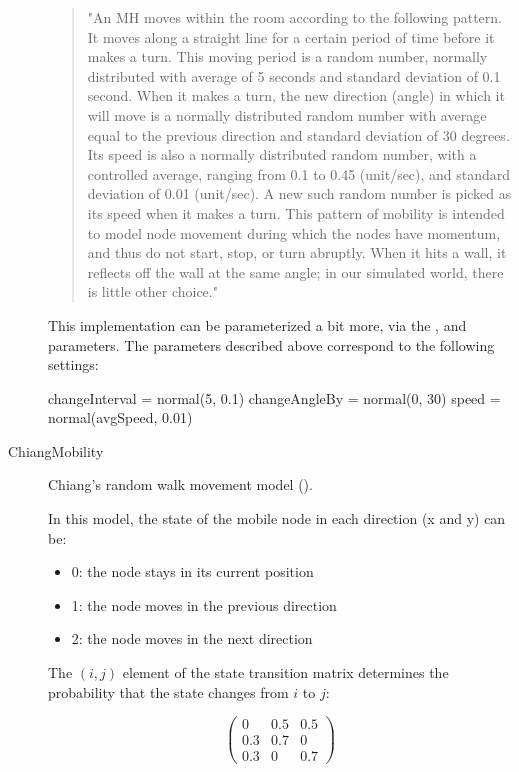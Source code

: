 \begin{description}
\begin{quote}
"An MH moves within the room according to the following pattern. It moves
along a straight line for a certain period of time before it makes a turn.
This moving period is a random number, normally distributed with average of
5 seconds and standard deviation of 0.1 second. When it makes a turn, the
new direction (angle) in which it will move is a normally distributed
random number with average equal to the previous direction and standard
deviation of 30 degrees. Its speed is also a normally distributed random
number, with a controlled average, ranging from 0.1 to 0.45 (unit/sec), and
standard deviation of 0.01 (unit/sec). A new such random number is picked
as its speed when it makes a turn. This pattern of mobility is intended to
model node movement during which the nodes have momentum, and thus do not
start, stop, or turn abruptly. When it hits a wall, it reflects off the
wall at the same angle; in our simulated world, there is little other
choice."
\end{quote}

This implementation can be parameterized a bit more, via the
,  and  parameters.
The parameters described above correspond to the following settings:

\begin{inifile}
changeInterval = normal(5, 0.1)
changeAngleBy = normal(0, 30)
speed = normal(avgSpeed, 0.01)
\end{inifile}

\item[ChiangMobility] Chiang's random walk movement model
(\cite{Chiang98wirelessnetwork}).

In this model, the state of the mobile node in each direction (x and y) can be:

\begin{itemize}
  \item 0: the node stays in its current position
  \item 1: the node moves in the previous direction
  \item 2: the node moves in the next direction
\end{itemize}

The $(i,j)$ element of the state transition matrix determines the
probability that the state changes from $i$ to $j$:

$$ \left(
\begin{array}{ccc}
  0 & 0.5 & 0.5 \\
  0.3 & 0.7 & 0 \\
  0.3 & 0 & 0.7
\end{array}
\right) $$


\end{description}
